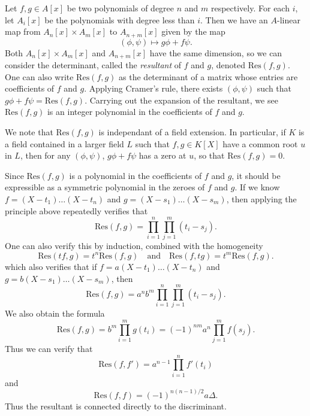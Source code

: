 \begin{example}
    Let $f,g \in A[x]$ be two polynomials of degree $n$ and $m$ respectively. For each $i$, let $A_i[x]$ be the polynomials with degree less than $i$. Then we have an $A$-linear map from $A_n[x] \times A_m[x]$ to $A_{n+m}[x]$ given by the map
    \[ (\phi,\psi) \mapsto g \phi + f \psi. \]
    Both $A_n[x] \times A_m[x]$ and $A_{n+m}[x]$ have the same dimension, so we can consider the determinant, called the \emph{resultant} of $f$ and $g$, denoted $\text{Res}(f,g)$. One can also write $\text{Res}(f,g)$ as the determinant of a matrix whose entries are coefficients of $f$ and $g$. Applying Cramer's rule, there exists $(\phi,\psi)$ such that $g \phi + f \psi = \text{Res}(f,g)$. Carrying out the expansion of the resultant, we see $\text{Res}(f,g)$ is an integer polynomial in the coefficients of $f$ and $g$.

    We note that $\text{Res}(f,g)$ is independant of a field extension. In particular, if $K$ is a field contained in a larger field $L$ such that $f,g \in K[X]$ have a common root $u$ in $L$, then for any $(\phi,\psi)$, $g \phi + f \psi$ has a zero at $u$, so that $\text{Res}(f,g) = 0$.

    Since $\text{Res}(f,g)$ is a polynomial in the coefficients of $f$ and $g$, it should be expressible as a symmetric polynomial in the zeroes of $f$ and $g$. If we know $f = (X - t_1) \dots (X - t_n)$ and $g = (X - s_1) \dots (X - s_m)$, then applying the principle above repeatedly verifies that
    \[ \text{Res}(f,g) = \prod_{i = 1}^n \prod_{j = 1}^m (t_i - s_j). \]
    One can also verify this by induction, combined with the homogeneity
    \[ \text{Res}(tf,g) = t^n \text{Res}(f,g) \quad\text{and}\quad \text{Res}(f,tg) = t^m \text{Res}(f,g). \]
    which also verifies that if $f = a(X - t_1) \dots (X - t_n)$ and $g = b(X - s_1) \dots (X - s_m)$, then
    \[ \text{Res}(f,g) = a^n b^m \prod_{i = 1}^n \prod_{j = 1}^m (t_i - s_j). \]
    We also obtain the formula
    \[ \text{Res}(f,g) = b^m \prod_{i = 1}^m g(t_i) = (-1)^{nm} a^n \prod_{j = 1}^m f(s_j). \]
    Thus we can verify that
    \[ \text{Res}(f,f') = a^{n-1} \prod_{i = 1}^n f'(t_i) \]
    and
    \[ \text{Res}(f,f) = (-1)^{n(n-1)/2} a \Delta. \]
    Thus the resultant is connected directly to the discriminant.
\end{example}















